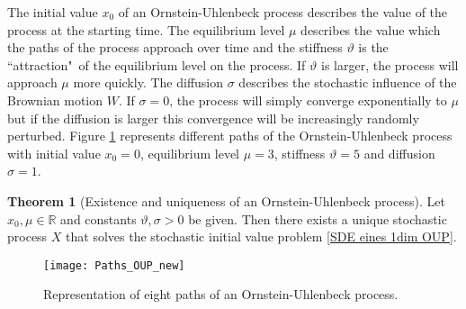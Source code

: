 \documentclass[11pt,titlepage]{article}
\newcommand{\R}{\mathbb{R}} %
\theoremstyle{definition}
\newtheorem{theorem}{Theorem}[section]
\theoremstyle{remark}
\begin{document}
	The initial value $x_0$ of an Ornstein-Uhlenbeck process describes the value of the process at the starting time. The equilibrium level $\mu$ describes the value which the paths of the process approach over time and the stiffness $\vartheta$ is the ``attraction"\ of the equilibrium level on the process. If $\vartheta$ is larger, the process will approach $\mu$  more quickly. The diffusion $\sigma$ describes the stochastic influence of the Brownian motion $W$. If $\sigma = 0$, the process will simply converge exponentially to $\mu$ 
	but if the diffusion is larger this convergence will be increasingly randomly perturbed.
	Figure \ref{Abb Pfade OUP} represents different paths of the Ornstein-Uhlenbeck process with initial value $x_0=0$, equilibrium level $\mu = 3$, stiffness $\vartheta = 5$ and diffusion $\sigma =1$.
	
	\begin{theorem}[Existence and uniqueness of an Ornstein-Uhlenbeck process]\label{OUP ex and unique 1dim}
		Let $x_0,\mu\in\R$ and constants $\vartheta,\sigma>0$ be given. Then there exists a unique 
		stochastic process $X$ that solves the stochastic initial value problem \ref{SDE eines 1dim OUP}.
	\end{theorem}

	\begin{figure}[H]
		\centering
		\texttt{[image: Paths\_OUP\_new]}
		\caption{Representation of eight paths of an Ornstein-Uhlenbeck process.}
		\label{Abb Pfade OUP}
	\end{figure}
\end{document}
